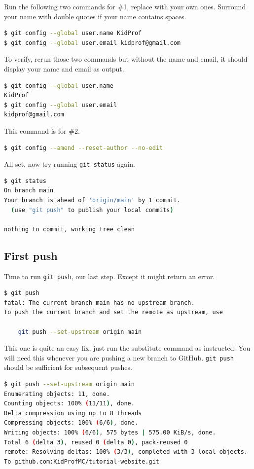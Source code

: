 Run the following two commands for \#1, replace with your own ones. Surround your name with double quotes if your name contains spaces.

\begin{lstlisting}[language=bash]
$ git config --global user.name KidProf
$ git config --global user.email kidprof@gmail.com
\end{lstlisting}

To verify, rerun those two commands but without the name and email, it should display your name and email as output.

\begin{lstlisting}[language=bash]
$ git config --global user.name
KidProf
$ git config --global user.email
kidprof@gmail.com
\end{lstlisting}

This command is for \#2.

\begin{lstlisting}[language=bash]
$ git config --amend --reset-author --no-edit
\end{lstlisting}

All set, now try running \texttt{git status} again.

\begin{lstlisting}[language=bash]
$ git status
On branch main
Your branch is ahead of 'origin/main' by 1 commit.
  (use "git push" to publish your local commits)

nothing to commit, working tree clean
\end{lstlisting}

\subsection*{First push}

Time to run \texttt{git push}, our last step. Except it might return an error.

\begin{lstlisting}[language=bash]
$ git push
fatal: The current branch main has no upstream branch.
To push the current branch and set the remote as upstream, use

    git push --set-upstream origin main
\end{lstlisting}

This one is quite an easy fix, just run the substitute command as instructed. You will need this whenever you are pushing a new branch to GitHub. \texttt{git push} should be sufficient for subsequent pushes.

\begin{lstlisting}[language=bash]
$ git push --set-upstream origin main
Enumerating objects: 11, done.
Counting objects: 100% (11/11), done.
Delta compression using up to 8 threads
Compressing objects: 100% (6/6), done.
Writing objects: 100% (6/6), 575 bytes | 575.00 KiB/s, done.
Total 6 (delta 3), reused 0 (delta 0), pack-reused 0
remote: Resolving deltas: 100% (3/3), completed with 3 local objects.
To github.com:KidProfMC/tutorial-website.git
\end{lstlisting}

